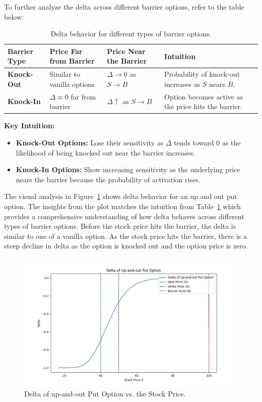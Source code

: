 To further analyze the delta across different barrier options, refer to the table below:
\begin{center}
	\begin{table}[H]
		\begin{tabular}{ | m{3cm} | m{5cm}| m{4cm} | m{4cm}|} 
			\hline
			\textbf{Barrier Type} & \textbf{Price Far from Barrier} & \textbf{Price Near the Barrier} & \textbf{Intuition}  \\
			\hline
			\textbf{Knock-Out} & Similar to vanilla options     & $\Delta \to 0$ as $S \to B$  & Probability of knock-out increases as $S$ nears $B$. \\ 
			\hline
			\textbf{Knock-In}  & $\Delta \approx 0$ far from barrier   & $\Delta \uparrow$ as $S \to B$  & Option becomes active as the price hits the barrier. \\ 
			\hline
		\end{tabular}
		\caption{Delta behavior for different types of barrier options.}
		\label{tab:delta_barrier_options}
	\end{table}
\end{center}
\textbf{Key Intuition:}
\begin{itemize}
	\item \textbf{Knock-Out Options:} Lose their sensitivity as $\Delta$ tends toward $0$ as the likelihood of being knocked out near the barrier increases.
	\item \textbf{Knock-In Options:} Show increasing sensitivity as the underlying price nears the barrier because the probability of activation rises.
\end{itemize}

The visual analysis in Figure~\ref{fig:delta_upout} shows delta behavior for an up and out put option. The insights from the plot matches the intuition from Table~\ref{tab:delta_barrier_options} which provides a comprehensive understanding of how delta behaves across different types of barrier options. Before the stock price hits the barrier, the delta is similar to one of a vanilla option. As the stock price hits the barrier, there is a steep decline in delta as the option is knocked out and the option price is zero.
\begin{figure}[H]
	\centering
	\includegraphics[width=.65\linewidth]{content/images/delta_upout.png}
	\caption{Delta of up-and-out Put Option vs. the Stock Price.}
	\label{fig:delta_upout}
\end{figure}

